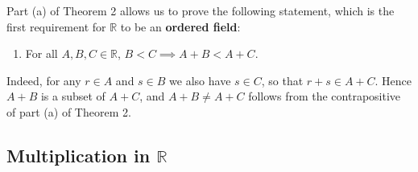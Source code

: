 \documentclass[12pt]{article}
\theoremstyle{definition}
\begin{document}
Part (a) of Theorem 2 allows us to prove the following statement, which is the first requirement for \( \mathbb{R} \) to be an \textbf{ordered field}:

\begin{enumerate}[label = (OF\arabic*), left = 6px]
    \item For all \( A, B, C \in \mathbb{R} \), \( B < C \implies A + B < A + C \).
\end{enumerate}

Indeed, for any \( r \in A \) and \( s \in B \) we also have \( s \in C \), so that \( r + s \in A + C \). Hence \( A + B \) is a subset of \( A + C \), and \( A + B \neq A + C\) follows from the contrapositive of part (a) of Theorem 2.

\subsection{Multiplication in \texorpdfstring{\(\mathbb{R}\)}{}}
\end{document}
